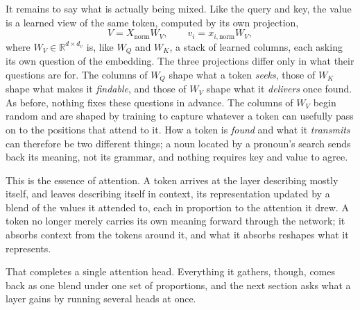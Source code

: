 \documentclass[11pt]{article}
\begin{document}
It remains to say what is actually being mixed. Like the query and key, the value is a learned view of the same token, computed by its own projection,
\[
V = X_{\text{norm}} W_V, \qquad v_i = x_{i,\text{norm}} W_V,
\]
where $W_V \in \mathbb{R}^{d \times d_v}$ is, like $W_Q$ and $W_K$, a stack of learned columns, each asking its own question of the embedding. The three projections differ only in what their questions are for. The columns of $W_Q$ shape what a token \textit{seeks}, those of $W_K$ shape what makes it \textit{findable}, and those of $W_V$ shape what it \textit{delivers} once found. As before, nothing fixes these questions in advance. The columns of $W_V$ begin random and are shaped by training to capture whatever a token can usefully pass on to the positions that attend to it. How a token is \textit{found} and what it \textit{transmits} can therefore be two different things; a noun located by a pronoun's search sends back its meaning, not its grammar, and nothing requires key and value to agree.

This is the essence of attention. A token arrives at the layer describing mostly itself, and leaves describing itself in context, its representation updated by a blend of the values it attended to, each in proportion to the attention it drew. A token no longer merely carries its own meaning forward through the network; it absorbs context from the tokens around it, and what it absorbs reshapes what it represents.

That completes a single attention head. Everything it gathers, though, comes back as one blend under one set of proportions, and the next section asks what a layer gains by running several heads at once.
\end{document}
